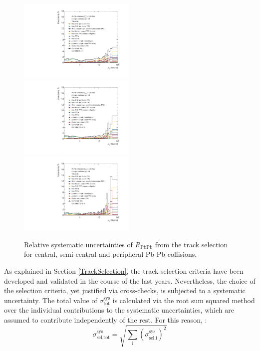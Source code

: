 \documentclass[12pt,a4paper]{report}
\begin{document}
\begin{figure}[!htb]
\centering
\includegraphics[width=0.495\textwidth]{Plots/SysUncRaacent.pdf}  
\includegraphics[width=0.495\textwidth]{Plots/SysUncRaasemi.pdf}  
\includegraphics[width=0.495\textwidth]{Plots/SysUncRaaperi.pdf}  
\caption{Relative systematic uncertainties of $R_\text{PbPb}$ from the track selection for central, semi-central  and peripheral Pb-Pb collisions.}
\label{SysUncRaa}
\end{figure}
As explained in Section \ref{TrackSelection}, the track selection criteria have been developed and validated in the course of the last years. Nevertheless, the choice of the selection criteria, yet justified via cross-checks, is subjected to a systematic uncertainty. The total value of $\sigma^\text{sys}_\text{tot}$ is calculated via the root sum squared method over the individual contributions to the systematic uncertainties, which are assumed to contribute independently of the rest. For this reason, :
\begin{equation}
\sigma^\text{sys}_\text{sel,tot} = \sqrt{\sum_{\text{i}}\left(\sigma^\text{sys}_\text{sel,i} \right)^2}
\end{equation} 
\end{document}
